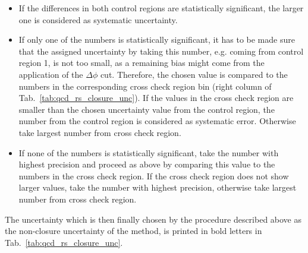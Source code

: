 \begin{itemize}
 \item If the differences in both control regions are statistically significant, the larger one is considered as systematic uncertainty. 
 \item If only one of the numbers is statistically significant, it has to be made sure that the assigned uncertainty by taking this number, e.g. coming from control region 1, is not too small, as a remaining bias might come from the application of the $\Delta \phi$ cut. Therefore, the chosen value is compared to the numbers in the corresponding cross check region bin (right column of Tab.~\ref{tab:qcd_rs_closure_unc}). If the values in the cross check region are smaller than the chosen uncertainty value from the control region, the number from the control region is considered as systematic error. Otherwise take largest number from cross check region.
 \item If none of the numbers is statistically significant, take the number with highest precision and proceed as above by comparing this value to the numbers in the cross check region. If the cross check region does not show larger values, take the number with highest precision, otherwise take largest number from cross check region.
\end{itemize}
The uncertainty which is then finally chosen by the procedure described above as the non-closure uncertainty of the method, is printed in bold letters in Tab.~\ref{tab:qcd_rs_closure_unc}.\\

